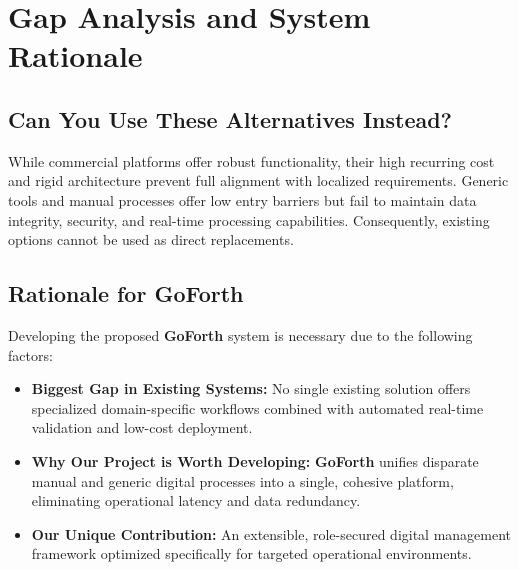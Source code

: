 \section{Gap Analysis and System Rationale}

\subsection{Can You Use These Alternatives Instead?}
While commercial platforms offer robust functionality, their high recurring cost and rigid architecture prevent full alignment with localized requirements. Generic tools and manual processes offer low entry barriers but fail to maintain data integrity, security, and real-time processing capabilities. Consequently, existing options cannot be used as direct replacements.

\subsection{Rationale for GoForth}
Developing the proposed \textbf{GoForth} system is necessary due to the following factors:
\begin{itemize}
    \item \textbf{Biggest Gap in Existing Systems:} No single existing solution offers specialized domain-specific workflows combined with automated real-time validation and low-cost deployment.
    \item \textbf{Why Our Project is Worth Developing:} \textbf{GoForth} unifies disparate manual and generic digital processes into a single, cohesive platform, eliminating operational latency and data redundancy.
    \item \textbf{Our Unique Contribution:} An extensible, role-secured digital management framework optimized specifically for targeted operational environments.
\end{itemize}
